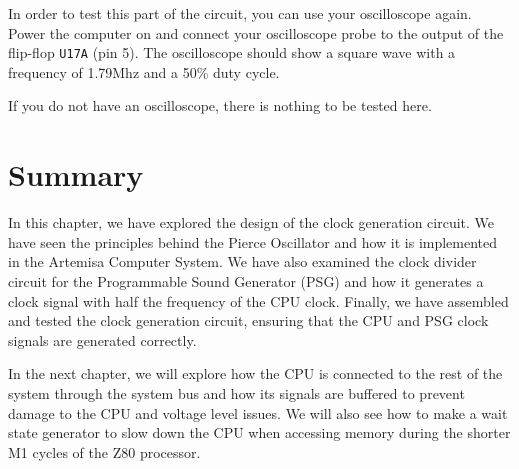 In order to test this part of the circuit, you can use your oscilloscope again. Power the computer on and connect your oscilloscope probe to the output of the flip-flop {\tt U17A} (pin 5). The oscilloscope should show a square wave with a frequency of 1.79Mhz and a 50\% duty cycle.

If you do not have an oscilloscope, there is nothing to be tested here.

\section{Summary}

In this chapter, we have explored the design of the clock generation circuit. We have seen the
principles behind the Pierce Oscillator and how it is implemented in the Artemisa Computer System.
We have also examined the clock divider circuit for the Programmable Sound Generator (PSG) and how
it generates a clock signal with half the frequency of the CPU clock. Finally, we have assembled and
tested the clock generation circuit, ensuring that the CPU and PSG clock signals are generated
correctly.

In the next chapter, we will explore how the CPU is connected to the rest of the system through the
system bus and how its signals are buffered to prevent damage to the CPU and voltage level issues.
We will also see how to make a wait state generator to slow down the CPU when accessing memory
during the shorter M1 cycles of the Z80 processor.
